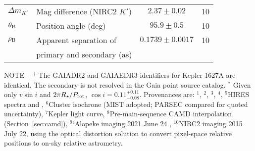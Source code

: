 \begin{table*}
\begin{tabular}{llcc}
$\Delta m_{K'}$ & Mag difference (NIRC2 $K'$)\dotfill & $2.37 \pm 0.02$ & 10 \\
$\theta_{\rm B}$ & Position angle (deg)\dotfill & $95.9 \pm 0.5$ & 10 \\
$\rho_{\rm B}$ & Apparent separation of \dotfill & $0.1739 \pm 0.0017$ &  10 \\
                    & \hspace{3pt} primary and secondary (as) &  \\
%
\hline
\end{tabular}
\begin{flushleft}
 \footnotesize{ \textsc{NOTE}---
 $^\dagger$ The GAIADR2 and GAIAEDR3 identifiers for Kepler 1627A are identical.  The secondary
 is not resolved in the Gaia point source catalog.
 $^*$ Given only $v\sin i$ and $2\pi R_\star/P_{\rm rot}$, $\cos i=0.11^{+0.11}_{-0.08}$.
Provenances are:
$^1$\citet{gaia_collaboration_2021_edr3},
$^2$\citet{stassun_TIC8_2019},
$^3$\citet{skrutskie_tmass_2006},
$^4$\citet{Lindegren_2021_offset},
$^5$HIRES spectra and \citet{yee_SM_2017},
$^6$Cluster isochrone (MIST adopted; PARSEC compared for quoted
  uncertainty),
$^7$Kepler light curve,
$^8$Pre-main-sequence CAMD interpolation (Section~\ref{sec:camd}),
$^9$`Alopeke imaging 2021 June 24 \citep{scott_twin_2021},
$^{10}$NIRC2 imaging 2015 July 22, using the \citet{yelda_2010} optical distortion solution to convert pixel-space relative positions to on-sky relative astrometry.
}
\end{flushleft}
\vspace{-0.5cm}
\end{table*}
